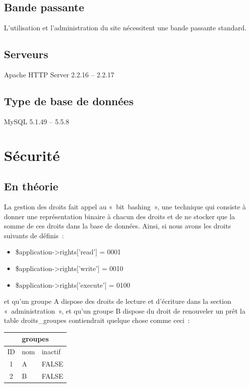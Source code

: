 \documentclass[letter, 10pt]{report}
\begin{document}
\subsection{Bande passante}
L'utilisation et l'administration du site nécessitent une bande passante standard.

\subsection{Serveurs}
Apache HTTP Server 2.2.16 -- 2.2.17

\subsection{Type de base de données}
MySQL 5.1.49 -- 5.5.8

\section{Sécurité}
\subsection{En théorie}

La gestion des droits fait appel au «~bit~bashing~», une technique qui consiste à donner une représentation binaire à chacun des droits et de ne stocker que la somme de ces droits dans la base de données. Ainsi, si nous avons les droits suivants de définis~:

\begin{itemize}
	\item \$application->rights['read'] = 0001
	\item \$application->rights['write'] = 0010
	\item \$application->rights['execute'] = 0100
\end{itemize}

et qu'un groupe A dispose des droits de lecture et d'écriture dans la section «~administration~», et qu'un groupe B dispose du droit de renouveler un prêt la table droits\_groupes contiendrait quelque chose comme ceci~:

\begin{tabular}{|c|l|l|}
	\hline
	\multicolumn{3}{|c|}{groupes} \\
	\hline
	ID & nom & inactif \\
	\hline
	1  & A   & FALSE \\
	2  & B   & FALSE \\
	\hline
\end{tabular}
\end{document}
